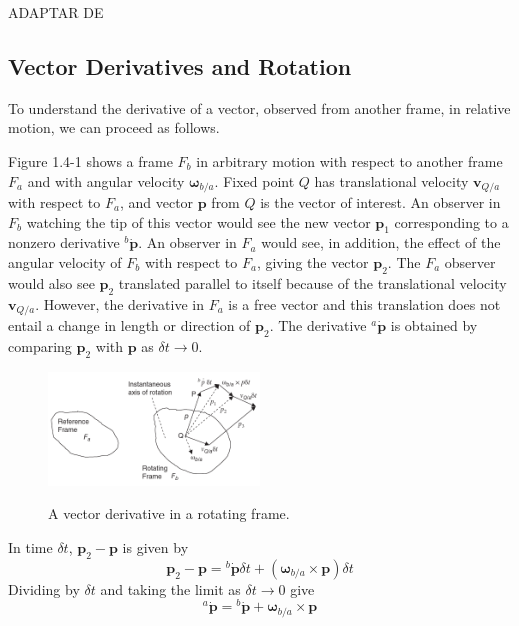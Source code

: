 ADAPTAR DE \cite{Stevens2016}

\subsection{Vector Derivatives and Rotation}

To understand the derivative of a vector, observed from another frame, in relative motion, we can proceed as follows.

Figure 1.4-1 shows a frame \(F_{b}\) in arbitrary motion with respect to another frame \(F_{a}\) and with angular velocity \(\mathbf{\omega}_{b/a}\). Fixed point \(Q\) has translational velocity \(\mathbf{v}_{Q/a}\) with respect to \(F_{a}\), and vector \(\mathbf{p}\) from \(Q\) is the vector of interest. An observer in \(F_{b}\) watching the tip of this vector would see the new vector \(\mathbf{p}_{1}\) corresponding to a nonzero derivative \({^b\dot{\mathbf{p}}}\). An observer in \(F_{a}\) would see, in addition, the effect of the angular velocity of \(F_{b}\) with respect to \(F_{a}\), giving the vector \(\mathbf{p}_{2}\). The \(F_{a}\) observer would also see \(\mathbf{p}_{2}\) translated parallel to itself because of the translational velocity \(\mathbf{v}_{Q/a}\). However, the derivative in \(F_{a}\) is a free vector and this translation does not entail a change in length or direction of \(\mathbf{p}_{2}\). The derivative \(^{a}\dot{\mathbf{p}}\) is obtained by comparing \(\mathbf{p}_{2}\) with \(\mathbf{p}\) as \(\delta t \rightarrow 0\).
\begin{figure}[h!]
    \centering
    \includegraphics[width=0.5\textwidth, keepaspectratio]{figuras/figure1.4-1.png}\label{fig1.4-1}
    \caption{A vector derivative in a rotating frame.}
\end{figure}
In time \(\delta t\), \(\mathbf{p}_{2} \!-\! \mathbf{p}\) is given by
\begin{equation*}
    \mathbf{p}_{2} - \mathbf{p} = {^{b}\dot{\mathbf{p}}} \delta t + \left( \mathbf{\omega}_{b/a} \! \times \!\mathbf{p} \right) \delta t
\end{equation*}
Dividing by \(\delta t\) and taking the limit as \(\delta t \rightarrow 0\) give
\begin{equation*} \tag{1.4-2}
    {^{a}\dot{\mathbf{p}}} = {^{b}\dot{\mathbf{p}}} + {\mathbf{\omega}_{b/a} \! \times \!\mathbf{p}}
\end{equation*}

